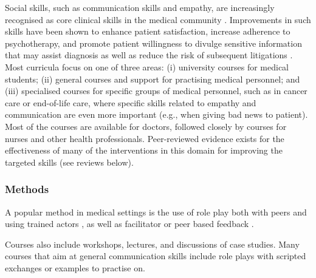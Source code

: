 \documentclass[prodmode,acmtochi]{acmsmall}
\newcommand{\GeraldineFIX}[1]{}
\begin{document}
Social skills, such as communication skills and empathy, are increasingly recognised as core clinical skills in the medical community \cite{Rider2006,Barth2011,Makoul2007,Kalet2004}. Improvements in such skills have been shown to enhance patient satisfaction, increase adherence to psychotherapy, and promote patient willingness to divulge sensitive information that may assist diagnosis as well as reduce the risk of subsequent litigations \cite{Stewart1995,Brown2008}. %
Most curricula focus on one of  three areas: (i) university courses for medical students; (ii) general courses and support for practising medical personnel; and (iii) specialised courses for specific groups of medical personnel, such as in cancer care or end-of-life care, where specific skills related to empathy and communication are even more important        (e.g., when giving bad news to patient). Most of the courses are available for doctors, followed closely by courses for nurses and other health professionals. Peer-reviewed evidence exists for the effectiveness of  many of the interventions in this domain for improving the targeted skills
(see reviews below).

\subsubsection*{Methods} A popular method in medical settings is the use of role play both with peers and using trained actors  \cite{Stepien2006,Stiefel2010,Kalet2004,Barth2011}, as well as facilitator or peer based feedback \cite{Rao2007}. 
\GeraldineFIX{G: \textbf{(G: on what?\ on the role plays, or is this another method ie not clear what 'followed by' refers to ... popularity or how role play is used)}}
Courses also include workshops, lectures, and discussions of case studies. Many courses that aim at general communication skills include role plays with scripted exchanges or examples to practise on. 
 \textbf{\GeraldineFIX{G: (G:\ how are these different to role plays??) P: These a specific sub-part of role plays (i.e., you can have other role plays without scripted exchange). I believe it is worth mentioning as such scripted (iu.e., fixed) exchanges can be readily supported by technology.}}
\end{document}
